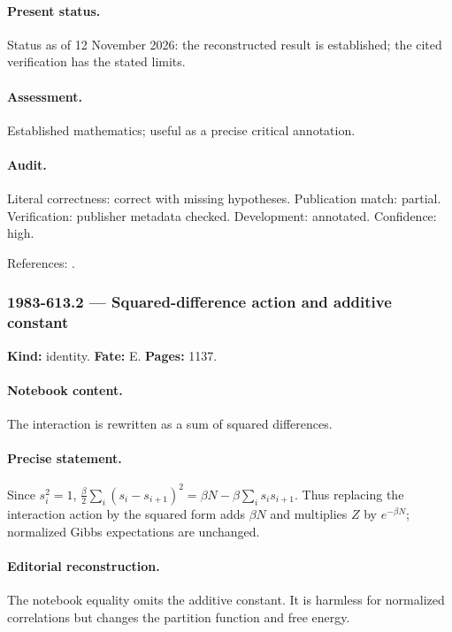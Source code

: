 \paragraph{Present status.} Status as of 12 November 2026: the reconstructed result is established; the cited verification has the stated limits.

\paragraph{Assessment.} Established mathematics; useful as a precise critical annotation.

\paragraph{Audit.} Literal correctness: correct with missing hypotheses. Publication match: partial. Verification: publisher metadata checked. Development: annotated. Confidence: high.

\noindent References: \citep{ising1925ferromagnetismus}.\par

\subsubsection{1983-613.2 --- Squared-difference action and additive constant}

\label{item:1983-613.2}

\noindent\textbf{Kind:} identity. \textbf{Fate:} E. \textbf{Pages:} 1137.\par

\paragraph{Notebook content.} The interaction is rewritten as a sum of squared differences.

\paragraph{Precise statement.} Since $s_i^2=1$, $\frac\beta2\sum_i(s_i-s_{i+1})^2=\beta N-\beta\sum_i s_i s_{i+1}$. Thus replacing the interaction action by the squared form adds $\beta N$ and multiplies $Z$ by $e^{-\beta N}$; normalized Gibbs expectations are unchanged.

\paragraph{Editorial reconstruction.} The notebook equality omits the additive constant. It is harmless for normalized correlations but changes the partition function and free energy.

